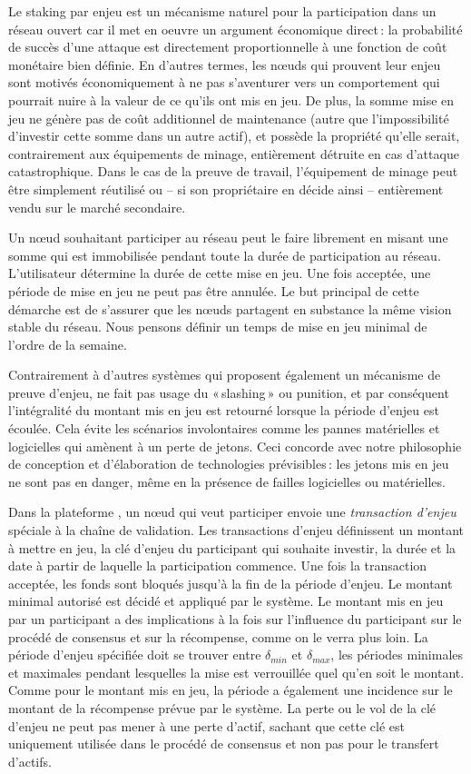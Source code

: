 \documentclass[runningheads,francais,a4paper]{llncs}
\begin{document}
Le staking par enjeu est un mécanisme naturel pour la participation dans un réseau ouvert car il met en oeuvre un
argument économique direct\,: la probabilité de succès d'une attaque est directement proportionnelle à une fonction de
coût monétaire bien définie. En d'autres termes, les nœuds qui prouvent leur enjeu sont motivés économiquement à ne pas
s'aventurer vers un comportement qui pourrait nuire à la valeur de ce qu'ils ont mis en jeu. De plus, la somme mise en
jeu ne génère pas de coût additionnel de maintenance (autre que l'impossibilité d'investir cette somme dans un autre
actif), et possède la propriété qu'elle serait, contrairement aux équipements de minage, entièrement détruite en cas
d'attaque catastrophique. Dans le cas de la preuve de travail, l'équipement de minage peut être simplement réutilisé ou
-- si son propriétaire en décide ainsi -- entièrement vendu sur le marché secondaire.

Un nœud souhaitant participer au réseau peut le faire librement en misant une somme qui est immobilisée pendant
toute la durée de participation au réseau. L'utilisateur détermine la durée de cette mise en jeu. Une fois acceptée, une
période de mise en jeu ne peut pas être annulée. Le but principal de cette démarche est de s'assurer que les nœuds
partagent en substance la même vision stable du réseau. Nous pensons définir un temps de mise en jeu minimal de l'ordre
de la semaine.

Contrairement à d'autres systèmes qui proposent également un mécanisme de preuve d'enjeu, \AVATokenName{} ne fait pas
usage du «\,slashing\,» ou punition, et par conséquent l'intégralité du montant mis en jeu est retourné lorsque la
période d'enjeu est écoulée. Cela évite les scénarios involontaires comme les pannes matérielles et logicielles qui
amènent à un perte de jetons. Ceci concorde avec notre philosophie de conception et d'élaboration de technologies
prévisibles\,: les jetons mis en jeu ne sont pas en danger, même en la présence de failles logicielles ou matérielles.

Dans la plateforme \AVAPlatformName, un nœud qui veut participer envoie une \emph{transaction d'enjeu} spéciale à la
chaîne de validation. Les transactions d'enjeu définissent un montant à mettre en jeu, la clé d'enjeu du participant qui
souhaite investir, la durée et la date à partir de laquelle la participation commence. Une fois la transaction
acceptée, les fonds sont bloqués jusqu'à la fin de la période d'enjeu. Le montant minimal autorisé est décidé et
appliqué par le système. Le montant mis en jeu par un participant a des implications à la fois sur 
l'influence du participant sur le procédé de consensus et sur la récompense, comme on le verra plus loin.
La période d'enjeu spécifiée doit se trouver entre $\delta_{min}$ et $\delta_{max}$, les périodes minimales et maximales pendant
lesquelles la mise est verrouillée quel qu'en soit le montant. Comme pour le montant mis en jeu, la période
a également une incidence sur le montant de la récompense prévue par le système. La perte ou le vol de la clé
d'enjeu ne peut pas mener à une perte d'actif, sachant que cette clé est uniquement utilisée dans le procédé de
consensus et non pas pour le transfert d'actifs.
\end{document}
